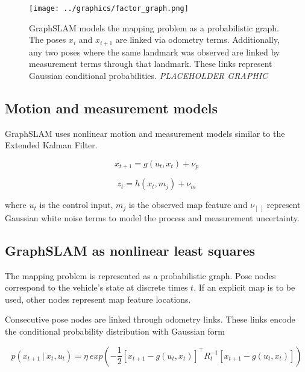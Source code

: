 \begin{figure}[htbp]
   \centering
   \texttt{[image: ../graphics/factor\_graph.png]} %
   \caption{GraphSLAM models the mapping problem as a probabilistic graph.  The poses $x_i$ and $x_{i+1}$ are linked via odometry terms. Additionally, any two poses where the same landmark was observed are linked by measurement terms through that landmark. These links represent Gaussian conditional probabilities. \emph{PLACEHOLDER GRAPHIC}}
   \label{fig:GraphSLAM}
\end{figure}


\subsection{Motion and measurement models}
\label{sec.motionmeas}
GraphSLAM uses nonlinear motion and measurement models similar to the Extended Kalman Filter.

\begin{equation}
x_{t+1} = g\left(u_t,x_t\right) + \nu_p
\end{equation}

\begin{equation}
z_{t} = h\left(x_t,m_j\right) + \nu_m
\end{equation}

where $u_t$ is the control input, $m_j$ is the observed map feature and $\nu_{[~]}$ represent Gaussian white noise terms to model the process and measurement uncertainty.

\subsection{GraphSLAM as nonlinear least squares}

The mapping problem is represented as a probabilistic graph. Pose nodes correspond to the vehicle's state at discrete times $t$. If an explicit map is to be used, other nodes represent map feature locations. 

Consecutive  pose nodes are linked through odometry links. These links encode the conditional probability distribution with Gaussian form

\begin{equation}
p\left(x_{t+1}~|~x_t,u_t\right) = \eta~ exp\left(-\frac{1}{2}\left[x_{t+1} - g\left(u_t,x_t\right)\right]^{\intercal}R_t^{-1}\left[x_{t+1} - g\left(u_t,x_t\right)\right]\right)
\end{equation}

